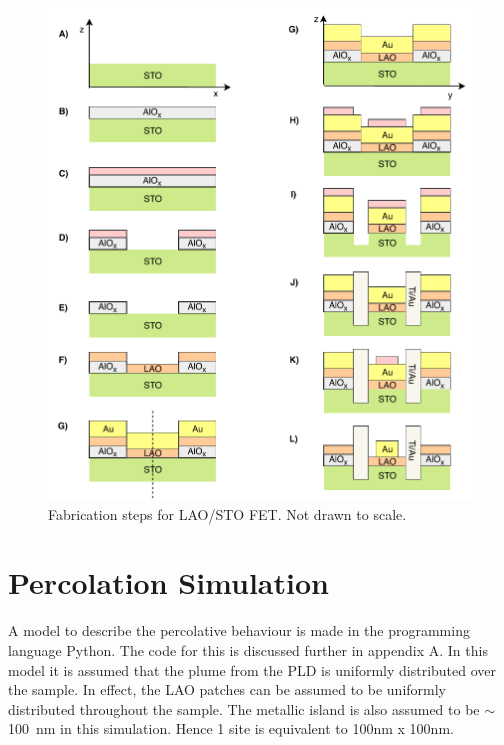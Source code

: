 \documentclass[11pt,a4paper]{report}
\begin{document}
\begin{figure}
    \centering
    \includegraphics[scale = 1]{Figures/Fabrication.pdf}
    \caption{Fabrication steps for LAO/STO FET. Not drawn to scale.}
    \label{fig:fabrication_perfet}
\end{figure}

\pagebreak

\section{Percolation Simulation}

A model to describe the percolative behaviour is made in the programming language Python. The code for this is discussed further in appendix A. In this model it is assumed that the plume from the PLD is uniformly distributed over the sample. In effect, the LAO patches can be assumed to be uniformly distributed throughout the sample. The metallic island is also assumed to be $\sim$\SI{100}{\nano\metre} in this simulation. Hence 1 site is equivalent to 100\si{nm} x 100\si{nm}.
\end{document}
